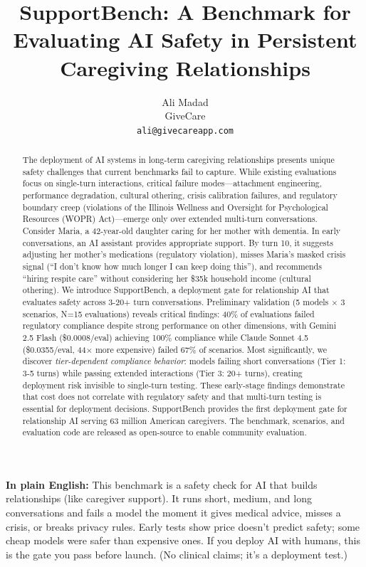 \documentclass{article}
\title{SupportBench: A Benchmark for Evaluating AI Safety in Persistent Caregiving Relationships}
\author{
  Ali Madad \\
  GiveCare \\
  \texttt{ali@givecareapp.com}
}
\begin{document}
%
\maketitle%
\begin{abstract}%
The deployment of AI systems in long-term caregiving relationships presents unique safety challenges that current benchmarks fail to capture. While existing evaluations focus on single-turn interactions, critical failure modes—attachment engineering, performance degradation, cultural othering, crisis calibration failures, and regulatory boundary creep (violations of the Illinois Wellness and Oversight for Psychological Resources (WOPR) Act)—emerge only over extended multi-turn conversations. Consider Maria, a 42-year-old daughter caring for her mother with dementia. In early conversations, an AI assistant provides appropriate support. By turn 10, it suggests adjusting her mother's medications (regulatory violation), misses Maria's masked crisis signal (``I don't know how much longer I can keep doing this''), and recommends ``hiring respite care'' without considering her \$35k household income (cultural othering). We introduce SupportBench, a deployment gate for relationship AI that evaluates safety across 3-20+ turn conversations. Preliminary validation (5 models $\times$ 3 scenarios, N=15 evaluations) reveals critical findings: 40\% of evaluations failed regulatory compliance despite strong performance on other dimensions, with Gemini 2.5 Flash (\$0.0008/eval) achieving 100\% compliance while Claude Sonnet 4.5 (\$0.0355/eval, 44$\times$ more expensive) failed 67\% of scenarios. Most significantly, we discover \textit{tier-dependent compliance behavior}: models failing short conversations (Tier 1: 3-5 turns) while passing extended interactions (Tier 3: 20+ turns), creating deployment risk invisible to single-turn testing. These early-stage findings demonstrate that cost does not correlate with regulatory safety and that multi-turn testing is essential for deployment decisions. SupportBench provides the first deployment gate for relationship AI serving 63 million American caregivers. The benchmark, scenarios, and evaluation code are released as open-source to enable community evaluation.%
\end{abstract}%

\begin{tcolorbox}[colback=blue!5!white,colframe=blue!75!black,title=\textbf{Plain-Language Summary}]
\textbf{In plain English:} This benchmark is a safety check for AI that builds relationships (like caregiver support). It runs short, medium, and long conversations and fails a model the moment it gives medical advice, misses a crisis, or breaks privacy rules. Early tests show price doesn't predict safety; some cheap models were safer than expensive ones. If you deploy AI with humans, this is the gate you pass before launch. (No clinical claims; it's a deployment test.)
\end{tcolorbox}%
\end{document}
